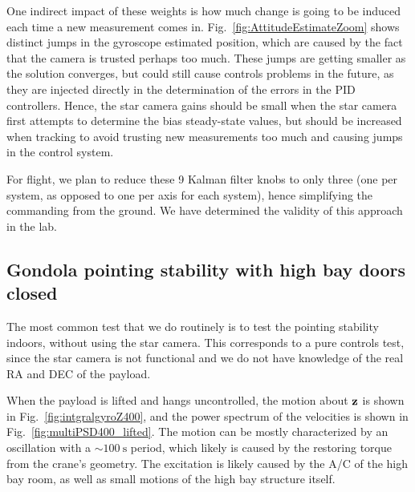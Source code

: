 One indirect impact of these weights is how much change is going to be induced each time a new measurement comes in. Fig.~\ref{fig:AttitudeEstimateZoom} shows distinct jumps in the gyroscope estimated position, which are caused by the fact that the camera is trusted perhaps too much. These jumps are getting smaller as the solution converges, but could still cause controls problems in the future, as they are injected directly in the determination of the errors in the PID controllers. Hence, the star camera gains should be small when the star camera first attempts to determine the bias steady-state values, but should be increased when tracking to avoid trusting new measurements too much and causing jumps in the control system. 

For flight, we plan to reduce these 9 Kalman filter knobs to only three (one per system, as opposed to one per axis for each system), hence simplifying the commanding from the ground. We have determined the validity of this approach in the lab.

\subsection{Gondola pointing stability with high bay doors closed}

The most common test that we do routinely is to test the pointing stability indoors, without using the star camera. This corresponds to a pure controls test, since the star camera is not functional and we do not have knowledge of the real RA and DEC of the payload. 

When the payload is lifted and hangs uncontrolled, the motion about $\textrm{\textbf{z}}$ is shown in Fig.~\ref{fig:intgralgyroZ400}, and the power spectrum of the velocities is shown in Fig.~\ref{fig:multiPSD400_lifted}. The motion can be mostly characterized by an oscillation with a $\sim\SI{100}{\second}$ period, which likely is caused by the restoring torque from the crane's geometry. The excitation is likely caused by the A/C of the high bay room, as well as small motions of the high bay structure itself.

